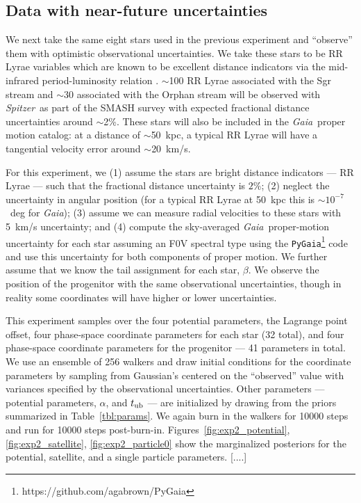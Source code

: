 \documentclass[letterpaper,12pt,preprint]{aastex}
\newcommand{\project}[1]{\textsl{#1}}
\newcommand{\gaia}{\project{Gaia}}
\newcommand{\spitzer}{\project{Spitzer}~}
\newcommand{\tub}{t_{\rm ub}}
\newcommand{\Loffset}{\alpha}
\begin{document}
\subsection{Data with near-future uncertainties}
We next take the same eight stars used in the previous experiment and ``observe'' them with optimistic observational uncertainties. We take these stars to be RR Lyrae variables which are known to be excellent distance indicators via the mid-infrared period-luminosity relation \citep[as shown in, e.g.,][]{madore12}. $\sim$100 RR Lyrae associated with the Sgr stream and $\sim$30 associated with the Orphan stream will be observed with \spitzer as part of the SMASH survey \citep{smashprop} with expected fractional distance uncertainties around $\sim$2\%. These stars will also be included in the \gaia\, proper motion catalog: at a distance of $\sim$50~kpc, a typical RR Lyrae will have a tangential velocity error around $\sim$20~km/s.

For this experiment, we (1) assume the stars are bright distance indicators --- RR Lyrae --- such that the fractional distance uncertainty is $2\%$; (2) neglect the uncertainty in angular position (for a typical RR Lyrae at 50~kpc this is $\sim$$10^{-7}$~deg for \gaia); (3) assume we can measure radial velocities to these stars with 5~km/s uncertainty; and (4) compute the sky-averaged \gaia\, proper-motion uncertainty for each star assuming an F0V spectral type using the \texttt{PyGaia}\footnote{https://github.com/agabrown/PyGaia} code and use this uncertainty for both components of proper motion. We further assume that we know the tail assignment for each star, $\beta$. We observe the position of the progenitor with the same observational uncertainties, though in reality some coordinates will have higher or lower uncertainties.

This experiment samples over the four potential parameters, the Lagrange point offset, four phase-space coordinate parameters for each star (32 total), and four phase-space coordinate parameters for the progenitor --- 41 parameters in total. We use an ensemble of 256 walkers and draw initial conditions for the coordinate parameters by sampling from Gaussian's centered on the ``observed'' value with variances specified by the observational uncertainties. Other parameters --- potential parameters, $\Loffset$, and $\tub$ --- are initialized by drawing from the priors summarized in Table~\ref{tbl:params}. We again burn in the walkers for 10000 steps and run for 10000 steps post-burn-in. Figures~\ref{fig:exp2_potential}, \ref{fig:exp2_satellite}, \ref{fig:exp2_particle0} show the marginalized posteriors for the potential, satellite, and a single particle parameters. [....]
\end{document}
